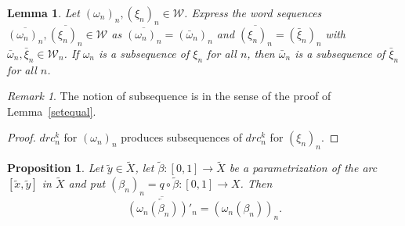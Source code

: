 \documentclass{amsart}
\newtheorem{lemma}[theorem]{Lemma}
\newtheorem{proposition}[theorem]{Proposition}
\theoremstyle{definition}
\theoremstyle{remark}
\newtheorem{remark}[theorem]{Remark}
\numberwithin{equation}{section}
\begin{document}
\begin{lemma}\label{sub} Let $(\omega_n)_n,(\xi_n)_n\in \mathcal W$. Express the word sequences $\overline{(\omega_n)_n}, \overline{(\xi_n)_n}\in {\mathcal W}$ as $\overline{(\omega_n)_n}=(\bar{\omega}_n)_n$ and
$\overline{(\xi_n)_n}=(\bar{\xi}_n)_n$ with $\bar{\omega}_n, \bar{\xi}_n\in {\mathcal W}_n$. If $\omega_n$ is a subsequence of $\xi_n$ for all $n$, then $\bar{\omega}_n$ is a subsequence of $\bar{\xi}_n$ for all $n$.
\end{lemma}

\begin{remark} The notion of subsequence is in the sense of the proof of Lemma~\ref{setequal}.
\end{remark}

\begin{proof}  $drc_n^k$ for $(\omega_n)_n$ produces subsequences of $drc_n^k$ for $(\xi_n)_n$.
\end{proof}

\begin{proposition}\label{arc}
Let $\tilde{y}\in \tilde{X}$, let  $\tilde{\beta}:[0,1]\rightarrow \tilde{X}$ be a parametrization of the arc $[\tilde{x},\tilde{y}]$ in $\tilde{X}$ and put $(\beta_n)_n=q\circ\tilde{\beta}:[0,1]\rightarrow X$. Then
\[\overline{\overleftarrow{(\omega_n(\beta_n))'_n}}=(\omega_n(\beta_n))_n.\]
\end{proposition}
\end{document}
